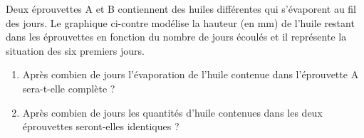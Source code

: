 %
%
    \parbox[c]{.5\linewidth}{Deux éprouvettes A et B contiennent des huiles différentes qui s'évaporent au fil des jours.
        Le graphique ci-contre modélise la hauteur (en mm) de l'huile restant dans les éprouvettes en fonction du nombre de jours écoulés et il représente la situation des six premiers jours.}
    \hfil
    
    \begin{enumerate}
        \item Après combien de jours l'évaporation de l'huile contenue dans l'éprouvette A sera-t-elle complète ?
        \item Après combien de jours les quantités d'huile contenues dans les deux éprouvettes seront-elles identiques ?
    \end{enumerate}
